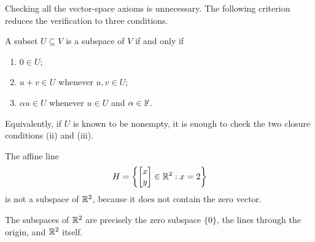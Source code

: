 Checking all the vector-space axioms is unnecessary. The following
criterion reduces the verification to three conditions.

\begin{proposition}\label{prop:subspace-criterion}
  A subset $U\subseteq V$ is a subspace of $V$ if and only if
  \begin{enumerate}[label=(\roman*)]
    \item $0\in U$;
    \item $u+v\in U$ whenever $u,v\in U$;
    \item $\alpha u\in U$ whenever $u\in U$ and $\alpha\in\mathbb{F}$.
  \end{enumerate}
  Equivalently, if $U$ is known to be nonempty, it is enough to check
  the two closure conditions (ii) and (iii).
\end{proposition}

\begin{example}
  The affine line
  \[
    H=\left\{\begin{bmatrix}x\\y\end{bmatrix}\in\mathbb{R}^2:x=2\right\}
  \]
  is not a subspace of $\mathbb{R}^2$, because it does not contain the zero
  vector.
\end{example}

The subspaces of $\mathbb{R}^2$ are precisely the zero subspace
$\{0\}$, the lines through the origin, and $\mathbb{R}^2$ itself.

